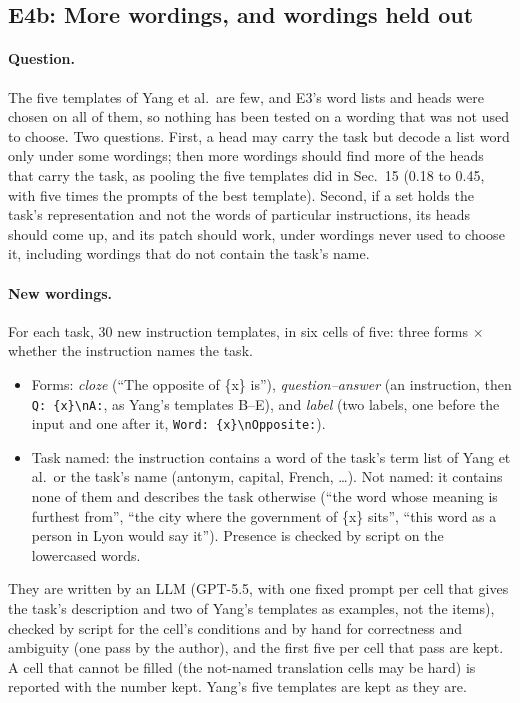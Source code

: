 \subsection{E4b: More wordings, and wordings held out}
\label{sec:e4b}

\paragraph{Question.} The five templates of Yang et al.\ are few, and E3's word lists and
heads were chosen on all of them, so nothing has been tested on a wording that was not used
to choose. Two questions. First, a head may carry the task but decode a list word only under
some wordings; then more wordings should find more of the heads that carry the task, as
pooling the five templates did in Sec.~15 (0.18 to 0.45, with five times the prompts of the
best template). Second, if a set holds the task's
representation and not the words of particular instructions, its heads should come up, and its
patch should work, under wordings never used to choose it, including wordings that do not
contain the task's name.

\paragraph{New wordings.} For each task, 30 new instruction templates, in six cells of five:
three forms $\times$ whether the instruction names the task.
\begin{itemize}
  \item Forms: \emph{cloze} (``The opposite of \{x\} is''), \emph{question--answer} (an
    instruction, then \verb|Q: {x}\nA:|, as Yang's templates B--E), and
    \emph{label} (two labels, one before the input and one after it, \verb|Word: {x}\nOpposite:|).
  \item Task named: the instruction contains a word of the task's term list of Yang et al.\ or
    the task's name (antonym, capital, French, \ldots). Not named: it contains none of them
    and describes the task otherwise (``the word whose meaning is furthest from'', ``the city where
    the government of \{x\} sits'', ``this word as a person in Lyon would say it''). Presence is
    checked by script on the lowercased words.
\end{itemize}
They are written by an LLM (GPT-5.5, with one fixed prompt per cell that gives the task's
description and two of Yang's templates as examples, not the items), checked by script for the
cell's conditions and by hand for correctness and ambiguity (one pass by the author), and the
first five per cell that pass are kept. A cell that cannot be filled (the not-named translation
cells may be hard) is reported with the number kept. Yang's five templates are kept as they are.

